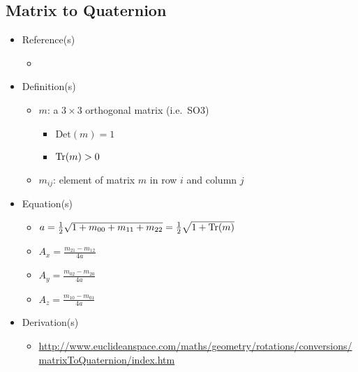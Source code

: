 \documentclass[letterpaper]{article}
\begin{document}
	\subsection{Matrix to Quaternion}
	\begin{itemize}
		\item Reference(s)
			\begin{itemize}
				\item \cite{Baker2008}
			\end{itemize}
		\item Definition(s)
			\begin{itemize}
				\item $m$: a $3\times 3$ orthogonal matrix (i.e.\ SO3)
					\begin{itemize}
						\item $\mathrm{Det}(m) = 1$
						\item $\mathrm{Tr}(m) > 0$
					\end{itemize}
				\item $m_{ij}$: element of matrix $m$ in row $i$ and column $j$
			\end{itemize}
		\item Equation(s)
			\begin{itemize}
				\item $a = \frac{1}{2}\sqrt{1 + m_{00} + m_{11} + m_{22}} = \frac{1}{2}\sqrt{1 + \mathrm{Tr}(m)}$
				\item $A_x = \frac{m_{21} - m_{12}}{4a}$
				\item $A_y = \frac{m_{02} - m_{20}}{4a}$
				\item $A_z = \frac{m_{10} - m_{01}}{4a}$
			\end{itemize}
		\item Derivation(s)
			\begin{itemize}
				\item \url{http://www.euclideanspace.com/maths/geometry/rotations/conversions/matrixToQuaternion/index.htm}
			\end{itemize}
	\end{itemize}
	
\end{document}
